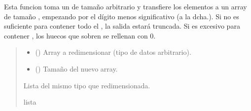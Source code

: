 \documentclass[letterpaper,10pt,english]{sphinxmanual}
\begin{document}

\begin{fulllineitems}
\label{\detokenize{fpga.interfaz_pcps:fpga.interfaz_pcps.resize_array}}
\pysigstartsignatures
{}
\pysigstopsignatures
\sphinxAtStartPar
Esta funcion toma un  de tamaño arbitrario y transfiere los elementos a un array de tamaño , empezando por el dígito menos significativo (a la dcha.). Si  no es suficiente para contener todo el , la salida estará truncada. Si  es excesivo para contener , los huecos que sobren se rellenan con 0.
\begin{quote}\begin{description}
\begin{itemize}
\item {} 
\sphinxAtStartPar
{} () \textendash{} Array a redimensionar (tipo de datos arbitrario).

\item {} 
\sphinxAtStartPar
{} () \textendash{} Tamaño del nuevo array.

\end{itemize}

\sphinxAtStartPar
Lista del mismo tipo que  redimensionada.

\sphinxAtStartPar
lista

\end{description}\end{quote}

\end{fulllineitems}

\end{document}
